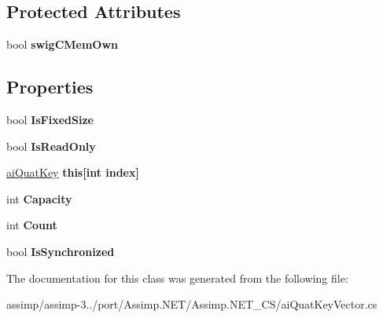 \subsection*{Protected Attributes}
\begin{DoxyCompactItemize}
\item 
\hypertarget{classai_quat_key_vector_a664d046e4013a39cd9ee2f6bd26a2eb5}{bool {\bfseries swig\+C\+Mem\+Own}}\label{classai_quat_key_vector_a664d046e4013a39cd9ee2f6bd26a2eb5}

\end{DoxyCompactItemize}
\subsection*{Properties}
\begin{DoxyCompactItemize}
\item 
\hypertarget{classai_quat_key_vector_aa84865d5cf04fb5736537b3eff3ce884}{bool {\bfseries Is\+Fixed\+Size}}\label{classai_quat_key_vector_aa84865d5cf04fb5736537b3eff3ce884}

\item 
\hypertarget{classai_quat_key_vector_a59ffeba2478ee9a8281fb2bc0bbe60d1}{bool {\bfseries Is\+Read\+Only}}\label{classai_quat_key_vector_a59ffeba2478ee9a8281fb2bc0bbe60d1}

\item 
\hypertarget{classai_quat_key_vector_ab5e668ca410eb619d77c5879412c5b6f}{\hyperlink{structai_quat_key}{ai\+Quat\+Key} {\bfseries this\mbox{[}int index\mbox{]}}}\label{classai_quat_key_vector_ab5e668ca410eb619d77c5879412c5b6f}

\item 
\hypertarget{classai_quat_key_vector_aac96783c96686a80ee8ef68d40507ce5}{int {\bfseries Capacity}}\label{classai_quat_key_vector_aac96783c96686a80ee8ef68d40507ce5}

\item 
\hypertarget{classai_quat_key_vector_a1c67cd1060ff6817ea964a5bd6c9fe50}{int {\bfseries Count}}\label{classai_quat_key_vector_a1c67cd1060ff6817ea964a5bd6c9fe50}

\item 
\hypertarget{classai_quat_key_vector_a52dd5e310109073cfc81b7d56c059887}{bool {\bfseries Is\+Synchronized}}\label{classai_quat_key_vector_a52dd5e310109073cfc81b7d56c059887}

\end{DoxyCompactItemize}


The documentation for this class was generated from the following file\+:\begin{DoxyCompactItemize}
\item 
assimp/assimp-\/3../port/\+Assimp.\+N\+E\+T/\+Assimp.\+N\+E\+T\+\_\+\+C\+S/ai\+Quat\+Key\+Vector.\+cs\end{DoxyCompactItemize}
